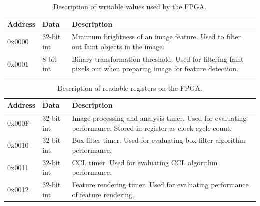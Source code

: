 \documentclass[12pt]{report}
\begin{document}
\begin{table}[h]
    \begin{tabular}{|p{2cm}|p{2cm}|p{9cm}|}
        \hline
        \textbf{Address}&\textbf{Data}&\textbf{Description}\\
        \hline
        0x0000&32-bit int&Minimum brightness of an image feature. Used to filter out faint objects in the image.\\
        \hline
        0x0001&8-bit int&Binary transformation threshold. Used for filtering faint pixels out when preparing image for feature detection.\\ 
        \hline
    \end{tabular}
    \caption{Description of writable values used by the FPGA.}
    \label{table:regs1}
\end{table}
\begin{table}[h]
    \begin{tabular}{|p{2cm}|p{2cm}|p{9cm}|}
        \hline
        \textbf{Address}&\textbf{Data}&\textbf{Description}\\
        \hline
        0x000F&32-bit int&Image processing and analysis timer. Used for evaluating performance. Stored in register as clock cycle count.\\
        \hline
        0x0010&32-bit int&Box filter timer. Used for evaluating box filter algorithm performance.\\ 
        \hline
        0x0011&32-bit int&CCL timer. Used for evaluating CCL algorithm performance.\\
        \hline
        0x0012&32-bit int&Feature rendering timer. Used for evaluating performance of feature rendering.\\
        \hline
    \end{tabular}
    \caption{Description of readable registers on the FPGA.}
    \label{table:regs2}
\end{table}
\end{document}
